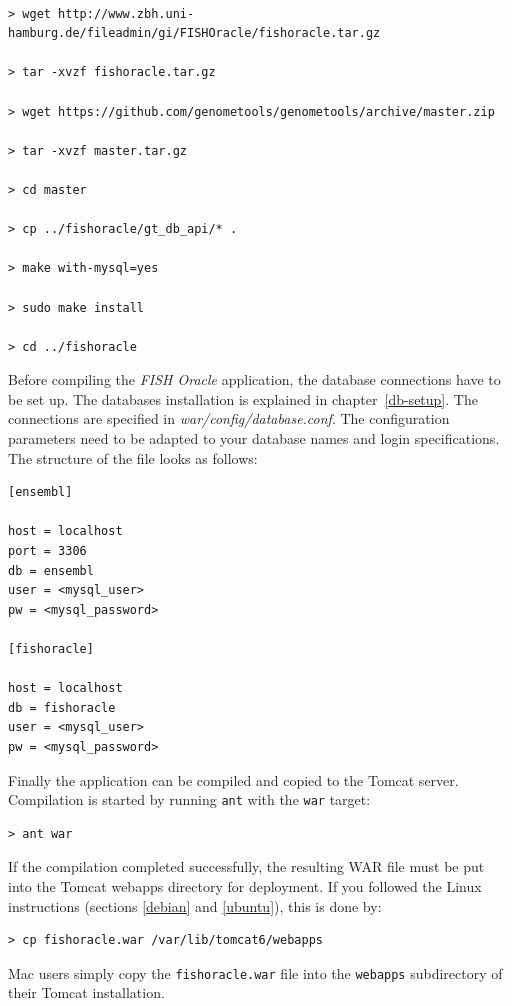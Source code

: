 \documentclass[11pt,final]{article}
\newcommand{\FO}[0]{\emph{FISH Oracle}\xspace}
\begin{document}
\begin{lstlisting}

> wget http://www.zbh.uni-hamburg.de/fileadmin/gi/FISHOracle/fishoracle.tar.gz

> tar -xvzf fishoracle.tar.gz

> wget https://github.com/genometools/genometools/archive/master.zip

> tar -xvzf master.tar.gz

> cd master

> cp ../fishoracle/gt_db_api/* .

> make with-mysql=yes

> sudo make install

> cd ../fishoracle

\end{lstlisting}

Before compiling the \FO application, the database connections have
to be set up. The databases installation is explained in
chapter~\ref{db-setup}. The connections are specified in
\textit{war/config/database.conf}. The configuration parameters need to be
adapted to your database names and login specifications. The structure of the
file looks as follows:

\begin{verbatim}
[ensembl]

host = localhost
port = 3306
db = ensembl
user = <mysql_user>
pw = <mysql_password>

[fishoracle]

host = localhost
db = fishoracle
user = <mysql_user>
pw = <mysql_password>
\end{verbatim}

Finally the application can be compiled and copied to the Tomcat server.
Compilation is started by running \texttt{ant} with the \texttt{war} target:

\begin{lstlisting}
> ant war
\end{lstlisting}

If the compilation completed successfully, the resulting WAR file must be
put into the Tomcat webapps directory for deployment.
If you followed the Linux instructions (sections \ref{debian} and \ref{ubuntu}),
this is done by:

\begin{lstlisting}
> cp fishoracle.war /var/lib/tomcat6/webapps
\end{lstlisting}

Mac users simply copy the \texttt{fishoracle.war} file into the \texttt{webapps}
subdirectory of their Tomcat installation.
\end{document}

